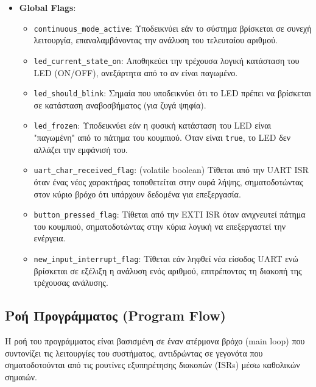 \documentclass{article}
\begin{document}
\begin{itemize}
    \item \textbf{Global Flags}:
    \begin{itemize}
        \item \texttt{continuous\_mode\_active}: Υποδεικνύει εάν το σύστημα βρίσκεται σε συνεχή λειτουργία, επαναλαμβάνοντας την ανάλυση του τελευταίου αριθμού.
        \item \texttt{led\_current\_state\_on}: Αποθηκεύει την τρέχουσα λογική κατάσταση του LED (ON/OFF), ανεξάρτητα από το αν είναι παγωμένο.
        \item \texttt{led\_should\_blink}: Σημαία που υποδεικνύει ότι το LED πρέπει να βρίσκεται σε κατάσταση αναβοσβήματος (για ζυγά ψηφία).
        \item \texttt{led\_frozen}: Υποδεικνύει εάν η φυσική κατάσταση του LED είναι "παγωμένη" από το πάτημα του κουμπιού. Όταν είναι \texttt{true}, το LED δεν αλλάζει την εμφάνισή του.
        \item \texttt{uart\_char\_received\_flag}: (volatile boolean) Τίθεται από την UART ISR όταν ένας νέος χαρακτήρας τοποθετείται στην ουρά λήψης, σηματοδοτώντας στον κύριο βρόχο ότι υπάρχουν δεδομένα για επεξεργασία.
        \item \texttt{button\_pressed\_flag}: Τίθεται από την EXTI ISR όταν ανιχνευτεί πάτημα του κουμπιού, σηματοδοτώντας στην κύρια λογική να επεξεργαστεί την ενέργεια.
        \item \texttt{new\_input\_interrupt\_flag}: Τίθεται εάν ληφθεί νέα είσοδος UART ενώ βρίσκεται σε εξέλιξη η ανάλυση ενός αριθμού, επιτρέποντας τη διακοπή της τρέχουσας ανάλυσης.
    \end{itemize}
\end{itemize}

\subsection{Ροή Προγράμματος (Program Flow)}
Η ροή του προγράμματος είναι βασισμένη σε έναν ατέρμονα βρόχο (main loop) που συντονίζει τις λειτουργίες του συστήματος, αντιδρώντας σε γεγονότα που σηματοδοτούνται από τις ρουτίνες εξυπηρέτησης διακοπών (ISRs) μέσω καθολικών σημαιών.
\end{document}

